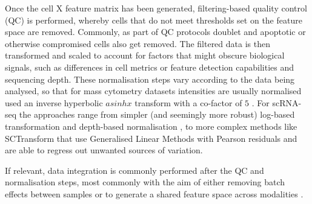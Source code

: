 Once the cell X feature matrix has been generated, filtering-based quality control (QC) is performed, whereby cells that do not meet thresholds set on the feature space are removed. Commonly, as part of QC protocols doublet and apoptotic or otherwise compromised cells also get removed.
The filtered data is then transformed and scaled to account for factors that might obscure biological signals, such as differences in cell metrics or feature detection capabilities and sequencing depth. These normalisation steps vary according to the data being analysed, so that for mass cytometry datasets intensities are usually normalised used an inverse hyperbolic \(asinh x\) transform with a co-factor of \(5\) \cite{bendall_single-cell_2011,guldberg_computational_2023}. For scRNA-seq the approaches range from simpler (and seemingly more robust) log-based transformation \cite{ahlmann-eltze_comparison_2023} and depth-based normalisation \cite{booeshaghi_depth_2022}, to more complex methods like SCTransform \cite{hafemeister_normalization_2019} that use Generalised Linear Methods with Pearson residuals and are able to regress out unwanted sources of variation.

If relevant, data integration is commonly performed after the QC and normalisation steps, most commonly with the aim of either removing batch effects between samples or to generate a shared feature space across modalities \cite{cao_multi-omics_2022}. 

